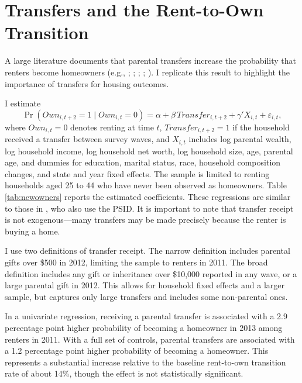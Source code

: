 \documentclass[12pt]{article}
\begin{document}
\newpage
\begingroup\singlespacing


\endgroup
\newpage


\appendix

\setcounter{figure}{0}
\renewcommand{\thefigure}{A\arabic{figure}}
\setcounter{table}{0}
\renewcommand{\thetable}{A\arabic{table}}

\section{Transfers and the Rent-to-Own Transition}\label{app:rent_to_own}
A large literature documents that parental transfers increase the probability that renters become homeowners (e.g., \citealp{wold2024housing}; \citealp{Blickle2019}; \citealp{benetton2022dynastic}; \citealp{Guiso2002}; \citealp{Engelhardt1998}). I replicate this result to highlight the importance of transfers for housing outcomes. 

I estimate
\begin{equation}	\label{eq:transferrent}
	\Pr\left(Own_{i,t+2}=1 \mid Own_{i,t}=0\right)
	= \alpha + \beta\,Transfer_{i,t+2}
	  + \gamma' X_{i,t} + \varepsilon_{i,t},
\end{equation}
where \(Own_{i,t}=0\) denotes renting at time \(t\), \(Transfer_{i,t+2}=1\) if the household received a transfer between survey waves, and \(X_{i,t}\) includes log parental wealth, log household income, log household net worth, log household size, age, parental age, and dummies for  education, marital status, race, household composition changes, and state and year fixed effects. The sample is limited to renting households aged 25 to 44 who have never been observed as homeowners. Table \ref{tab:newowners} reports the estimated coefficients. These regressions are similar to those in \cite{Lee2018}, who also use the PSID.  It is important to note that transfer receipt is not exogenous---many transfers may be made precisely because the renter is buying a home.

I use two definitions of transfer receipt. The narrow definition includes parental gifts over \$500 in 2012, limiting the sample to renters in 2011. The broad definition includes any gift or inheritance over \$10,000 reported in any wave, or a large parental gift in 2012. This allows for household fixed effects and a larger sample, but captures only large transfers and includes some non-parental ones.

In a univariate regression, receiving a parental transfer is associated with a 2.9 percentage point higher probability of becoming a homeowner in 2013 among renters in 2011. With a full set of controls, parental transfers are associated with a 1.2 percentage point higher probability of becoming a homeowner. This represents a substantial increase relative to the baseline rent-to-own transition rate of about 14\%, though the effect is not statistically significant. 
\end{document}
